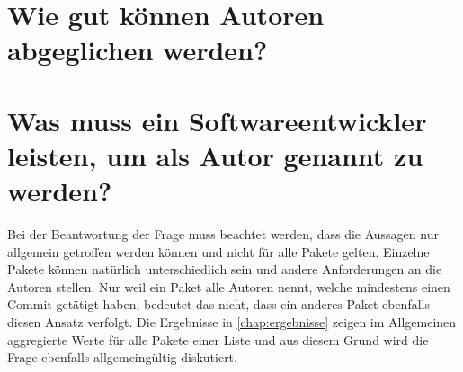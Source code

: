 \section{Wie gut können Autoren abgeglichen werden?}
\label{sec:abgleich_diskussion}

\section{Was muss ein Softwareentwickler leisten, um als Autor genannt zu werden?}
\label{sec:zitationsfaehiger_autor_diskussion}
Bei der Beantwortung der Frage muss beachtet werden, dass die Aussagen nur allgemein getroffen werden können und nicht für alle Pakete gelten.
Einzelne Pakete können natürlich unterschiedlich sein und andere Anforderungen an die Autoren stellen.
Nur weil ein Paket alle Autoren nennt, welche mindestens einen Commit getätigt haben, bedeutet das nicht, dass ein anderes Paket ebenfalls diesen Ansatz verfolgt.
Die Ergebnisse in \autoref{chap:ergebnisse} zeigen im Allgemeinen aggregierte Werte für alle Pakete einer Liste und aus diesem Grund wird die Frage ebenfalls allgemeingültig diskutiert.

